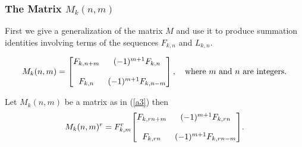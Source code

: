 \subsubsection{{The Matrix $M_{k}(n,m)$ }}
First we give a generalization of the matrix $M$ and use it to produce summation identities involving terms of the sequences $F_{k,n}$ and $L_{k,n}$. 
\begin{definition}\label{a3}
\begin{align}
 M_{k}(n,m) =\begin{bmatrix}
            F_{k,n+m} & (-1)^{m+1}F_{k,n}\bigskip \\
            F_{k,n} & (-1)^{m+1}F_{k,n-m}
          \end{bmatrix}, \quad \text{where $m$ and $n$ are integers.}
        \end{align}
\end{definition}
\begin{theorem} Let $M_{k}(n,m)$ be a matrix as in (\ref{a3}) then 
\begin{align*}
 M_{k}(n,m)^r = F_{k,m}^{r}{
          \begin{bmatrix}
                     F_{k,rn+m} & (-1)^{m+1}F_{k,rn}\bigskip \\
            F_{k,rn} & (-1)^{m+1}F_{k,rn-m} 
          \end{bmatrix}}.
\end{align*}
\end{theorem}
